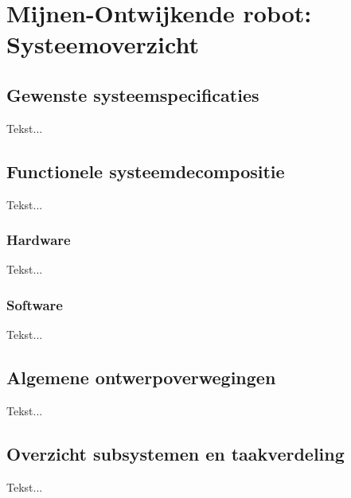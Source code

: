 \chapter[Mijnen-Ontwijkende robot: Systeemoverzicht]{Mijnen-Ontwijkende robot: Systeemoverzicht} \label {chapter:systeemoverzicht}

	\section{Gewenste systeemspecificaties}
		Tekst...
	
	\section{Functionele systeemdecompositie}
		Tekst...
		\subsection{Hardware}
			Tekst...
		\subsection{Software}
			Tekst...
	\section{Algemene ontwerpoverwegingen}
			Tekst...
	\section{Overzicht subsystemen en taakverdeling}
			Tekst...
